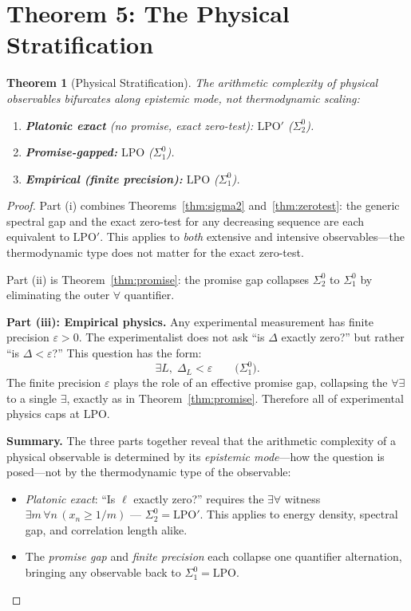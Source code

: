 \documentclass[11pt,a4paper]{article}
\theoremstyle{plain}
\newtheorem{theorem}{Theorem}[section]
\theoremstyle{definition}
\newcommand{\LPO}{\ensuremath{\mathrm{LPO}}}
\newcommand{\LPOj}{\ensuremath{\mathrm{LPO'}}}
\begin{document}
\section{Theorem 5: The Physical Stratification}\label{sec:stratification}

\begin{theorem}[Physical Stratification]\label{thm:stratification}
The arithmetic complexity of physical observables bifurcates
along \emph{epistemic mode}, not thermodynamic scaling:
\begin{enumerate}[nosep,label=(\roman*)]
\item \textbf{Platonic exact} (no promise, exact zero-test): $\LPOj$ ($\Sigma_2^0$).
\item \textbf{Promise-gapped:} $\LPO$ ($\Sigma_1^0$).
\item \textbf{Empirical (finite precision):} $\LPO$ ($\Sigma_1^0$).
\end{enumerate}
\end{theorem}

\begin{proof}
Part (i) combines Theorems~\ref{thm:sigma2} and~\ref{thm:zerotest}:
the generic spectral gap and the exact zero-test for any decreasing
sequence are each equivalent to $\LPOj$.  This applies to
\emph{both} extensive and intensive observables---the thermodynamic
type does not matter for the exact zero-test.

Part (ii) is Theorem~\ref{thm:promise}: the promise gap collapses
$\Sigma_2^0$ to $\Sigma_1^0$ by eliminating the outer $\forall$
quantifier.

\medskip\noindent
\textbf{Part (iii): Empirical physics.}
Any experimental measurement has finite precision
$\varepsilon > 0$.  The experimentalist does not ask
``is $\Delta$ exactly zero?'' but rather
``is $\Delta < \varepsilon$?''  This question has the form:
\[
  \exists L,\; \Delta_L < \varepsilon
  \qquad\text{($\Sigma_1^0$).}
\]
The finite precision $\varepsilon$ plays the role of
an effective promise gap, collapsing the $\forall\exists$
to a single $\exists$, exactly as in Theorem~\ref{thm:promise}.
Therefore all of experimental physics caps at $\LPO$.

\medskip\noindent
\textbf{Summary.} The three parts together reveal that the
arithmetic complexity of a physical observable is determined
by its \emph{epistemic mode}---how the question is posed---not
by the thermodynamic type of the observable:
\begin{itemize}[nosep]
\item \emph{Platonic exact}: ``Is $\ell$ exactly zero?'' requires
  the $\exists\forall$ witness $\exists m\,\forall n\,(x_n \geq 1/m)$
  --- $\Sigma_2^0 = \LPOj$. This applies to energy density, spectral gap,
  and correlation length alike.
\item The \emph{promise gap} and \emph{finite precision}
  each collapse one quantifier alternation, bringing any
  observable back to $\Sigma_1^0 = \LPO$.
\end{itemize}
\end{proof}
\end{document}
